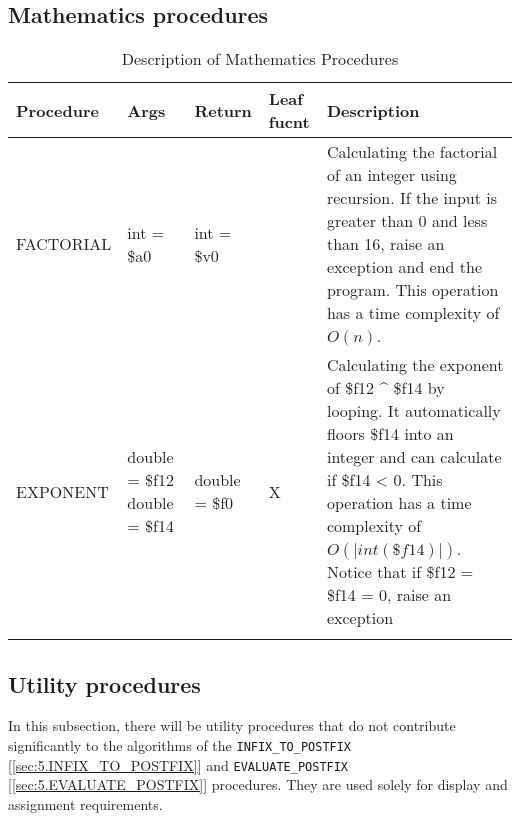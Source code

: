 \subsection{Mathematics procedures}
    \begin{longtable}{|m{2.5cm}|m{2.5cm}|m{2.5cm}|m{1cm}|m{5.6cm}|}
        \hline
            \textbf{Procedure} & 
            \textbf{Args} & 
            \textbf{Return} & 
            \centering \textbf{Leaf fucnt} &
            \textbf{Description}\\
        \hline
        \endfirsthead
            FACTORIAL& 
            int = \$a0&
            int = \$v0&
            &
            Calculating the factorial of an integer using recursion. If the input is greater than 0 and less than 16, raise an exception and end the program. This operation has a time complexity of \(O(n)\).\\
        \hline
            EXPONENT& 
            double = \$f12
            \newline double = \$f14&
            double = \$f0&
            \centering X&
            Calculating the exponent of \$f12 \^{} \$f14 by looping. It automatically floors \$f14 into an integer and can calculate if \$f14 < 0.  This operation has a time complexity of \(O(|int(\$f14)|)\). Notice that if \$f12 = \$f14 = 0, raise an exception\\
        \hline
        \caption{Description of Mathematics Procedures} \\
    \end{longtable}

\subsection{Utility procedures}
    In this subsection, there will be utility procedures that do not contribute significantly to the algorithms of the \texttt{INFIX\_TO\_POSTFIX} [\ref{sec:5.INFIX_TO_POSTFIX}] and \texttt{EVALUATE\_POSTFIX} [\ref{sec:5.EVALUATE_POSTFIX}] procedures. They are used solely for display and assignment requirements.


